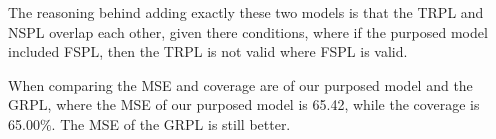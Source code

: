 The reasoning behind adding exactly these two models is that the TRPL and NSPL overlap each other, given there conditions, where if the purposed model included FSPL, then the TRPL is not valid where FSPL is valid. 



When comparing the MSE and coverage are of our purposed model and the GRPL, where the MSE of our purposed model is 65.42, while the coverage is 65.00$\%$. The MSE of the GRPL is still better.  \\



     

